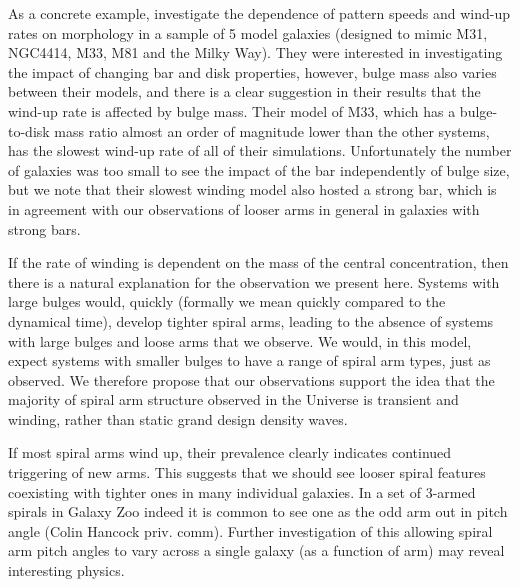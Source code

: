 \documentclass[usenatbib]{mn2e}
\begin{document}
  As a concrete example, \citet{PettittWadsley2018} investigate the dependence of pattern speeds and wind-up rates on morphology in a sample of 5 model galaxies (designed to mimic M31, NGC4414, M33, M81 and the Milky Way). They were interested in investigating the impact of changing bar and disk properties, however, bulge mass also varies between their models, and there is a clear suggestion in their results that the wind-up rate is affected by bulge mass. Their model of M33, which has a bulge-to-disk mass ratio almost an order of magnitude lower than the other systems, has the slowest wind-up rate of all of their simulations. Unfortunately the number of galaxies was too small to see the impact of the bar independently of bulge size, but we note that their slowest winding model also hosted a strong bar, which is in agreement with our observations of looser arms in general in galaxies with strong bars.

If the rate of winding is dependent on the mass of the central concentration, then there is a natural explanation for the observation we present here. Systems with large bulges would, quickly (formally we mean quickly compared to the dynamical time), develop tighter spiral arms, leading to the absence of systems with large bulges and loose arms that we observe. We would, in this model, expect systems with smaller bulges to have a range of spiral arm types, just as observed. We therefore propose that our observations support the idea that the majority of spiral arm structure observed in the Universe is transient and winding, rather than static grand design density waves. 

If most spiral arms wind up, their prevalence clearly indicates continued triggering of new arms. This suggests that we should see
looser spiral features coexisting with tighter ones in many individual galaxies. In a set of 3-armed spirals in Galaxy Zoo indeed it is 
common to see one as the odd arm out in pitch angle (Colin Hancock priv. comm). Further investigation of this allowing spiral arm pitch angles to vary across a single galaxy (as a function of arm) may reveal interesting physics. 
\end{document}
